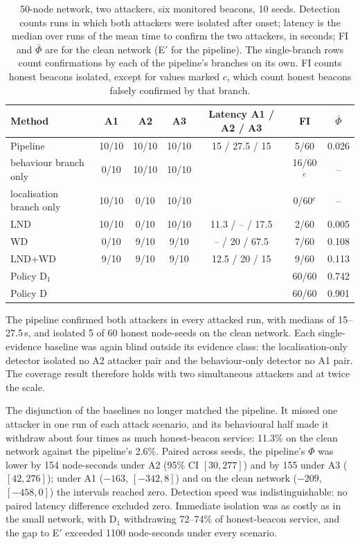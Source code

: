 \begin{table}[!t]
\caption{50-node network, two attackers, six monitored beacons, 10 seeds.
Detection counts runs in which both attackers were isolated after onset;
latency is the median over runs of the mean time to confirm the two
attackers, in seconds; FI and $\bar\Phi$ are for the clean network (E$'$ for
the pipeline). The single-branch rows count confirmations by each of the
pipeline's branches on its own. FI counts honest beacons isolated, except for
values marked $c$, which count honest beacons falsely confirmed by that
branch.}
\label{tab:scale}
\centering
\footnotesize
\setlength{\tabcolsep}{4pt}
\begin{tabular}{@{}lcccccc@{}}
\toprule
Method & A1 & A2 & A3 & Latency A1 / A2 / A3 & FI & $\bar\Phi$ \\
\midrule
Pipeline & 10/10 & 10/10 & 10/10 & 15 / 27.5 / 15 & 5/60 & 0.026 \\
\quad behaviour branch only & 0/10 & 10/10 & 10/10 & & 16/60$^{c}$ & -- \\
\quad localisation branch only & 10/10 & 0/10 & 10/10 & & 0/60$^{c}$ & -- \\
LND & 10/10 & 0/10 & 10/10 & 11.3 / -- / 17.5 & 2/60 & 0.005 \\
WD & 0/10 & 9/10 & 9/10 & -- / 20 / 67.5 & 7/60 & 0.108 \\
LND+WD & 9/10 & 9/10 & 9/10 & 12.5 / 20 / 15 & 9/60 & 0.113 \\
Policy D$_1$ & & & & & 60/60 & 0.742 \\
Policy D & & & & & 60/60 & 0.901 \\
\bottomrule
\end{tabular}
\end{table}

The pipeline confirmed both attackers in every attacked run, with medians of
15--27.5\,s, and isolated 5 of 60 honest node-seeds on the clean network.
Each single-evidence baseline was again blind outside its evidence class:
the localisation-only detector isolated no A2 attacker pair and the
behaviour-only detector no A1 pair. The coverage result therefore holds with
two simultaneous attackers and at twice the scale.

The disjunction of the baselines no longer matched the pipeline. It missed
one attacker in one run of each attack scenario, and its behavioural half
made it withdraw about four times as much honest-beacon service: 11.3\% on
the clean network against the pipeline's 2.6\%. Paired across
seeds, the pipeline's $\Phi$ was lower by 154 node-seconds under A2 (95\% CI
$[30, 277]$) and by 155 under A3 ($[42, 276]$); under A1 ($-163$,
$[-342, 8]$) and on the clean network ($-209$, $[-458, 0]$) the intervals
reached zero. Detection speed was indistinguishable: no paired latency
difference excluded zero. Immediate isolation was as costly as in the small
network, with D$_1$ withdrawing 72--74\% of honest-beacon service, and the
gap to E$'$ exceeded 1100 node-seconds under every scenario.

